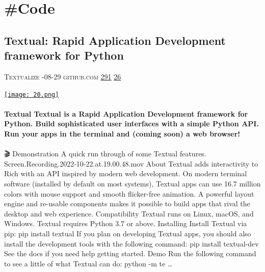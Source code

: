 \documentclass[10pt,a4paper]{article}
\begin{document}
\newpage
\section{\#Code}

\begin{multicols}{2}
\raggedcolumns
\noindent\begin{minipage}{\linewidth}
\medskip
\subsection{Textual: Rapid Application Development framework for Python}
\textsc{\footnotesize
{\scriptsize\faUser}\space 
Textualize 
{\scriptsize\faCalendar}-08-29 
{\scriptsize\faGithub}\space 
github.com 
{\scriptsize\faThumbsOUp}\space 
\href{http://news.ycombinator.com/item?id=37174657\&utm\_term=comment}{291} 
{\scriptsize\faComments}\space 
\href{http://news.ycombinator.com/item?id=37174657\&utm\_term=comment}{26} 
}
\par\medskip\noindent
\href{https://github.com/Textualize/textual?utm\_source=hackernewsletter\&utm\_medium=email\&utm\_term=code}{
    \texttt{[image: 20.png]}
}
\end{minipage}
\paragraph{}
\textbf{Textual
Textual is a Rapid Application Development framework for Python.
Build sophisticated user interfaces with a simple Python API. Run your apps in the terminal and (coming soon) a web browser!}
\paragraph{}

🎬 Demonstration
A quick run through of some Textual features.
Screen.Recording.2022-10-22.at.19.00.48.mov
About
Textual adds interactivity to Rich with an API inspired by modern web development.
On modern terminal software (installed by default on most systems), Textual apps can use 16.7 million colors with mouse support and smooth flicker-free animation. A powerful layout engine and re-usable components makes it possible to build apps that rival the desktop and web experience.
Compatibility
Textual runs on Linux, macOS, and Windows. Textual requires Python 3.7 or above.
Installing
Install Textual via pip:
pip install textual
If you plan on developing Textual apps, you should also install the development tools with the following command:
pip install textual-dev
See the docs if you need help getting started.
Demo
Run the following command to see a little of what Textual can do:
python -m te
\dots\par
\noindent\begin{minipage}{\linewidth}
\medskip

\end{minipage}
\end{multicols}
\end{document}
